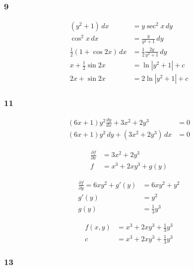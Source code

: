 \documentclass{article}
\begin{document}
\subsubsection{9}

\begin{align*}
  (y^2 + 1) \,dx                  & = y \sec^2 x \,dy                      \\
  \cos^2 x \,dx                   & = \frac{y}{y^2 + 1} \,dy               \\
  \frac{1}{2} (1 + \cos 2 x) \,dx & = \frac{1}{2} \frac{2 y}{y^2 + 1} \,dy \\
  x + \frac{1}{2} \sin 2 x        & = \ln |y^2 + 1| + c                    \\
  2 x + \sin 2 x                  & = 2 \ln |y^2 + 1| + c
\end{align*}

\subsubsection{11}

\begin{align*}
  (6 x + 1) y^2 \frac{dy}{dx} + 3 x^2 + 2 y^3 & = 0 \\
  (6 x + 1) y^2 \,dy + (3 x^2 + 2 y^3) \,dx   & = 0
\end{align*}

\begin{align*}
  \frac{\partial f}{\partial x} & = 3 x^2 + 2 y^3        \\
  f                             & = x^3 + 2 x y^3 + g(y)
\end{align*}

\begin{align*}
  \frac{\partial f}{\partial y} = 6 x y^2 + g'(y) & = 6 x y^2 + y^2   \\
  g'(y)                                           & = y^2             \\
  g(y)                                            & = \frac{1}{3} y^3
\end{align*}

\begin{align*}
  f(x, y) & = x^3 + 2 x y^3 + \frac{1}{3} y^3 \\
  c       & = x^3 + 2 x y^3 + \frac{1}{3} y^3
\end{align*}

\subsubsection{13}
\end{document}
